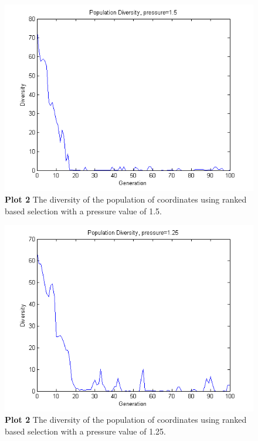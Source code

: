 \documentclass[a4paper]{article}
\begin{document}
\begin{figure}[H] %
	\includegraphics[scale=0.7]{divPress15.png}
	\caption{\label{fig:plot2Diversity15}\textbf{Plot 2} The diversity of the population of coordinates using ranked based selection with a pressure value of 1.5.}
\end{figure}
\begin{figure}[H] %
	\includegraphics[scale=0.7]{divPress125.png}
	\caption{\label{fig:plot2Diversity125}\textbf{Plot 2} The diversity of the population of coordinates using ranked based selection with a pressure value of 1.25.}
\end{figure}
\end{document}
